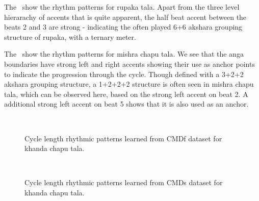 The \ show the rhythm patterns for \gls{rupaka} \gls{tala}. Apart from the three level hierarachy of accents that is quite apparent, the half beat accent between the beats 2 and 3 are strong - indicating the often played 6+6 \gls{akshara} grouping structure of \gls{rupaka}, with a ternary meter.

The \ show the rhythm patterns for \gls{mishra chapu} \gls{tala}. We see that the \gls{anga} boundaries have strong left and right accents showing their use as anchor points to indicate the progression through the cycle. Though defined with a 3+2+2 \gls{akshara} grouping structure, a 1+2+2+2 structure is often seen in \gls{mishra chapu} \gls{tala}, which can be observed here, based on the strong left accent on beat 2. A additional strong left accent on beat 5 shows that it is also used as an anchor. 
%
\begin{figure}[t]
\captionsetup[subfigure]{labelformat=empty}
\centering
{} \\ \vspace{-1.35cm}
\caption[Rhythm patterns in \gls{khanda chapu} \gls{tala} learned from \acrshort{CMDf} dataset]{Cycle length rhythmic patterns learned from \acrshort{CMDf} dataset for \gls{khanda chapu} \gls{tala}.}\label{fig:tt:CMDf:khandaChapu}
\end{figure}
%
%
\begin{figure}[t]
\captionsetup[subfigure]{labelformat=empty}
\centering
{} \\ \vspace{-1.35cm}
\caption[Rhythm patterns in \gls{khanda chapu} \gls{tala} learned from \acrshort{CMDs} dataset]{Cycle length rhythmic patterns learned from \acrshort{CMDs} dataset for \gls{khanda chapu} \gls{tala}.}\label{fig:tt:CMD:khandaChapu}
\end{figure}


